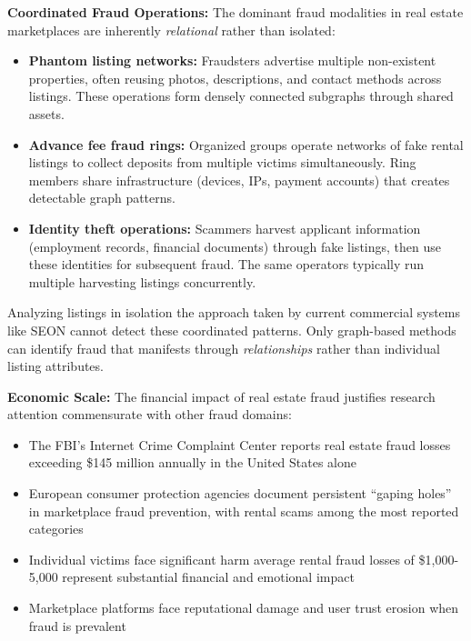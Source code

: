 \textbf{Coordinated Fraud Operations:} The dominant fraud modalities in real estate marketplaces are inherently \emph{relational} rather than isolated:

\begin{itemize}
    \item \textbf{Phantom listing networks:} Fraudsters advertise multiple non-existent properties, often reusing photos, descriptions, and contact methods across listings. These operations form densely connected subgraphs through shared assets.
    
    \item \textbf{Advance fee fraud rings:} Organized groups operate networks of fake rental listings to collect deposits from multiple victims simultaneously. Ring members share infrastructure (devices, IPs, payment accounts) that creates detectable graph patterns.
    
    \item \textbf{Identity theft operations:} Scammers harvest applicant information (employment records, financial documents) through fake listings, then use these identities for subsequent fraud. The same operators typically run multiple harvesting listings concurrently.
\end{itemize}

Analyzing listings in isolation the approach taken by current commercial systems like SEON cannot detect these coordinated patterns. Only graph-based methods can identify fraud that manifests through \emph{relationships} rather than individual listing attributes.

\textbf{Economic Scale:} The financial impact of real estate fraud justifies research attention commensurate with other fraud domains:

\begin{itemize}
    \item The FBI's Internet Crime Complaint Center reports real estate fraud losses exceeding \$145 million annually in the United States alone \cite{fbi2023ic3}
    \item European consumer protection agencies document persistent ``gaping holes'' in marketplace fraud prevention, with rental scams among the most reported categories
    \item Individual victims face significant harm average rental fraud losses of \$1,000-5,000 represent substantial financial and emotional impact
    \item Marketplace platforms face reputational damage and user trust erosion when fraud is prevalent
\end{itemize}

